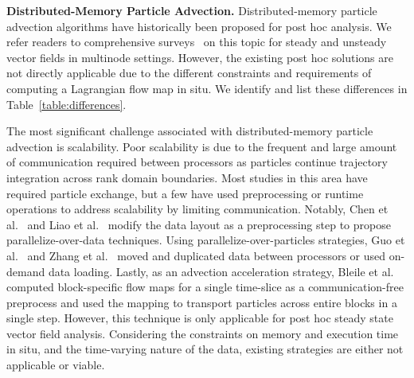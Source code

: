 \textbf{Distributed-Memory Particle Advection.}
%
Distributed-memory particle advection algorithms have historically been proposed for post hoc analysis.
%
We refer readers to comprehensive surveys~\cite{PeterkaRNLSKH11,zhang2018survey} on this topic for steady and unsteady vector fields in multinode settings.
%
However, the existing post hoc solutions are not directly applicable due to the different constraints and requirements of computing a Lagrangian flow map in situ.
%
We identify and list these differences in Table~\ref{table:differences}.

The most significant challenge associated with distributed-memory particle advection is scalability.
%
Poor scalability is due to the frequent and large amount of communication required between processors as particles continue trajectory integration across rank domain boundaries.
%
Most studies in this area have required particle exchange, but a few have used preprocessing or runtime operations to address scalability by limiting communication.
%
Notably, Chen et al.~\cite{ChenXLS12, ChenS13} and Liao et al.~\cite{Liao2019ScalablePF} modify the data layout as a preprocessing step to propose parallelize-over-data techniques.
%
%
Using parallelize-over-particles strategies, Guo et al.~\cite{GuoHSZHY14} and Zhang et al.~\cite{ZhangGY16} moved and duplicated data between processors or used on-demand data loading.
%
Lastly, as an advection acceleration strategy, Bleile et al.~\cite{bleile2017accelerating} computed block-specific flow maps for a single time-slice as a communication-free preprocess and used the mapping to transport particles across entire blocks in a single step. 
%
However, this technique is only applicable for post hoc steady state vector field analysis.
%
Considering the constraints on memory and execution time in situ, and the time-varying nature of the data, existing strategies are either not applicable or viable. 
%
%

